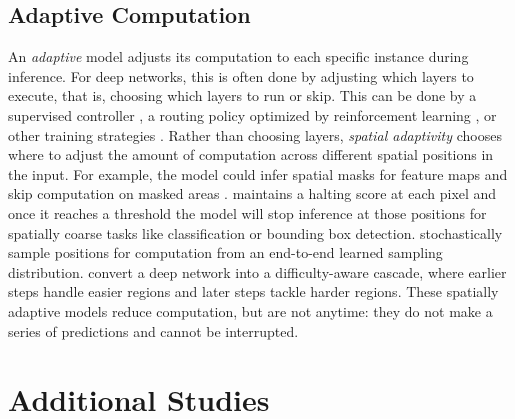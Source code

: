 \subsection{Adaptive Computation}
An \emph{adaptive} model adjusts its computation to each specific instance during inference.
For deep networks, this is often done by adjusting which layers to execute, that is, choosing which layers to run or skip.
This can be done by a supervised controller \cite{veit2018convolutional,liu2017dynamic}, a routing policy optimized by reinforcement learning \cite{wang2018skipnet,Wu2018BlockDropDI,lin2017runtime}, or other training strategies \cite{mcgill2017deciding}.
Rather than choosing layers, \emph{spatial adaptivity} chooses where to adjust the amount of computation across different spatial positions in the input.
For example, the model could infer spatial masks for feature maps and skip computation on masked areas \cite{pred0_0, pred0_1,pred0_3,pred0_4,pred0_5}.
\cite{figurnov2017spatially} maintains a halting score at each pixel and once it reaches a threshold the model will stop inference at those positions for spatially coarse tasks like classification or bounding box detection.
\cite{xie2020spatially} stochastically sample positions for computation from an end-to-end learned sampling distribution. 
\cite{li2017not} convert a deep network into a difficulty-aware cascade, where earlier steps handle easier regions and later steps tackle harder regions.
These spatially adaptive models reduce computation, but are not anytime: they do not make a series of predictions and cannot be interrupted.



\section{Additional Studies}
